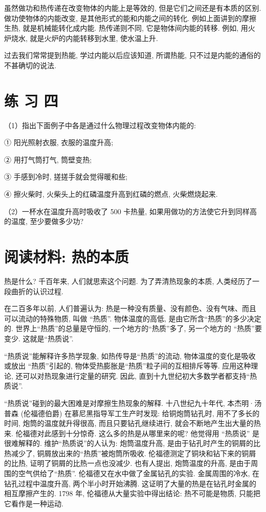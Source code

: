 \documentclass[10pt]{article}
\begin{document}
虽然做功和热传递在改变物体的内能上是等效的, 但是它们之间还是有本质的区别. 做功使物体的内能改变, 是其他形式的能和内能之间的转化. 例如上面讲到的摩擦生热, 就是机械能转化成内能. 热传递则不同, 它是物体间内能的转移. 例如, 用火炉烧水, 就是火炉的内能转移到水里, 使水温上升.

过去我们常常提到热能, 学过内能以后应该知道, 所谓热能, 只不过是内能的通俗的不甚确切的说法.

\section*{练 习 四}

（1）指出下面例子中各是通过什么物理过程改变物体内能的:

① 阳光照射衣服, 衣服的温度升高;

② 用打气筒打气, 筒壁变热;

③ 手感到冷时, 搓搓手就会觉得暖和些;

④ 擦火柴时, 火柴头上的红磷温度升高到红磷的燃点, 火柴燃烧起来.

（2）一杯水在温度升高时吸收了 500 卡热量, 如果用做功的方法使它升到同样高的温度, 至少要做多少功?

\section*{阅读材料: 热的本质}

热是什么? 千百年来, 人们就思索这个问题. 为了弄清热现象的本质, 人类经历了一段曲折的认识过程.

在二百多年以前, 人们普遍认为: 热是一种没有质量、没有颜色、没有气味、而且可以流动的特殊物质, 叫做 “热质”. 物体温度的高低, 是由它所含“热质”的多少决定的. 世界上“热质”的总量是守恒的, 一个地方的“热质”多了, 另一个地方的 “热质”要变少. 这就是“热质说”.

“热质说”能解释许多热学现象, 如热传导是“热质”的流动, 物体温度的变化是吸收或放出 “热质”引起的, 物体受热膨胀是“热质”粒子间的互相排斥等等. 应用这种理论, 还可以对热现象进行定量的研究. 因此, 直到十九世纪初大多数学者都支持“热质说”.

“热质说”碰到的最大困难是对摩擦生热现象的解释. 十八世纪九十年代, 本杰明·汤普森 (伦福德伯爵) 在慕尼黑指导军工生产时发现: 给铜炮筒钻孔时, 用不了多长的时间, 炮筒的温度就升得很高, 而且只要钻孔继续进行, 就会不断地产生出大量的热来. 伦福德对此感到十分惊奇. 这么多的热是从哪里来的呢? 他觉得用 “热质说” 是很难解释的. 维护“热质说”的人认为: 炮筒温度升高, 是由于钻孔时产生的铜屑的比热减少了, 铜屑放出来的“热质”被炮筒所吸收. 伦福德测定了铜块和钻下来的铜屑的比热, 证明了铜屑的比热一点也没减少. 也有人提出, 炮筒温度的升高, 是由于周围的空气供给了“热质”. 伦福德又在水中做了金属钻孔的实验. 金属周围的冷水, 在钻孔过程中温度升高, 两个半小时开始沸腾. 这证明了大量的热是在钻孔时金属的相互摩擦产生的. 1798 年, 伦福德从大量实验中得出结论: 热不可能是物质, 只能把它看作是一种运动.
\end{document}

